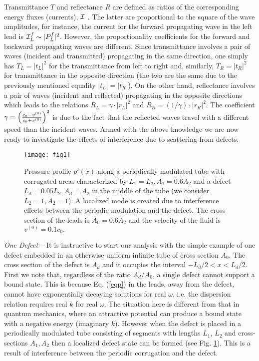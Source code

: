 \documentclass[aps,prl,twocolumn,groupedaddress,amsmath,amssymb]{revtex4}
\begin{document}
Transmittance $T$ and reflectance $R$ are defined as ratios of the corresponding energy fluxes (currents), ${\cal I}$ \cite{current}. The latter 
are proportional to the square of the wave amplitudes, for instance, the current for the forward propagating wave in the left lead is ${\cal I}^f_L 
\sim |P^f_L|^2$.  However, the proportionality coefficients for the forward and backward propagating waves are different. Since transmittance 
involves a pair of waves (incident and transmitted) propagating in the same direction, one simply has $T_L=|t_L|^2$ for the transmittance from 
left to right and, similarly, $T_R=|t_R|^2$ for transmittance in the opposite direction (the two are the same due to the previously mentioned 
equality $|t_L|=|t_R|$). On the other hand, reflectance involves a pair of waves (incident and reflected) propagating in the opposite directions 
which leads to the relations $R_L=\gamma \cdot |r_L|^2$ and  $R_R=(1/\gamma)\cdot |r_R|^2$. The coefficient $\gamma=\left({c_0-v^{(0)}
\over c_0+v^{(0)}}\right)^2$ is due to the fact that the reflected waves travel with a different speed than the incident waves. Armed with the 
above knowledge we are now ready to investigate the effects of interference due to scattering from defects.

\begin{figure}[h]
\texttt{[image: fig1]}
\caption{Pressure profile $p'(x)$ along a periodically modulated tube with corrugated areas characterized by $L_1=L_2, A_1=0.6 A_2$ 
and a defect $L_d=0.05 L_2,A_d=A_2$ in the middle of the tube (we consider $L_2=1, A_2=1$). A localized mode is created due to 
interference effects between the periodic modulation and the defect. The cross section of the leads is $A_0=0.6A_2$ and the velocity of the 
fluid is $v^{(0)}=0.1 c_0.$
}
\label{fig1}
\end{figure}


{\it One Defect --} It is instructive to start our analysis with the simple example of one defect embedded in an otherwise uniform
infinite tube of cross section $A_0$. The cross section of the defect is $A_d$ and it occupies the interval $-L_d/2<x<L_d/2$. First
we note that, regardless of the ratio $A_d/A_0$, a single defect cannot support a bound state. This is because Eq. (\ref{eqp}) in the
leads, away from the defect,  cannot have exponentially decaying solutions for real $\omega$, i.e. the dispersion relation requires
real $k$ for real $\omega$. The situation here is different from that in quantum mechanics, where an attractive potential can produce
a bound state with a negative energy (imaginary $k$). However when the defect is placed in a periodically modulated tube consisting 
of segments with lengths $L_1$, $L_2$ and cross-sections  $A_1,  A_2$ then a localized defect state can be formed (see 
Fig. \ref{fig1}). This is a result of interference between the periodic corrugation and the defect.
\end{document}
